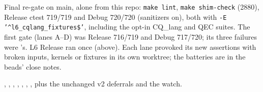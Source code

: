 Final re-gate on main, alone from this repo: \texttt{make lint},
\texttt{make shim-check} (2880), Release ctest 719/719 and Debug 720/720
(sanitizers on), both with \texttt{-E '\^{}l6\_cqlang\_fixtures\$'},
including the opt-in CQ\_lang and QEC suites. The first gate (lanes A--D)
was Release 716/719 and Debug 717/720; its three failures were
's. L6 Release ran once (above). Each lane provoked its new
assertions with broken inputs, kernels or fixtures in its own worktree;
the batteries are in the beads' close notes.

, , , , ,
, , plus the unchanged v2 deferrals and the
 watch.
